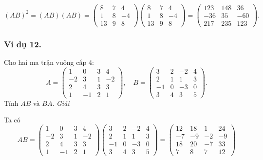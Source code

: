 \[
(AB)^2 = (AB)(AB) = \begin{pmatrix}
8 & 7 & 4 \\
1 & 8 & -4 \\
13 & 9 & 8
\end{pmatrix}
\begin{pmatrix}
8 & 7 & 4 \\
1 & 8 & -4 \\
13 & 9 & 8
\end{pmatrix}
= \begin{pmatrix}
123 & 148 & 36 \\
-36 & 35 & -60 \\
217 & 235 & 123
\end{pmatrix}
.
\]

\subsubsection*{Ví dụ 12.}
Cho hai ma trận vuông cấp 4:
\[
A = \begin{pmatrix}
1 & 0 & 3 & 4 \\
-2 & 3 & 1 & -2 \\
2 & 4 & 3 & 3 \\
1 & -1 & 2 & 1
\end{pmatrix}
, \quad
B = \begin{pmatrix}
3 & 2 & -2 & 4 \\
2 & 1 & 1 & 3 \\
-1 & 0 & -3 & 0 \\
3 & 4 & 3 & 5
\end{pmatrix}
.
\]
Tính \( AB \) và \( BA \).
\textit{Giải}

Ta có
\[
AB = \begin{pmatrix}
1 & 0 & 3 & 4 \\
-2 & 3 & 1 & -2 \\
2 & 4 & 3 & 3 \\
1 & -1 & 2 & 1
\end{pmatrix}
\begin{pmatrix}
3 & 2 & -2 & 4 \\
2 & 1 & 1 & 3 \\
-1 & 0 & -3 & 0 \\
3 & 4 & 3 & 5
\end{pmatrix}
= \begin{pmatrix}
12 & 18 & 1 & 24 \\
-7 & -9 & -2 & -9 \\
18 & 20 & -7 & 33 \\
7 & 8 & 7 & 12
\end{pmatrix}
\]

